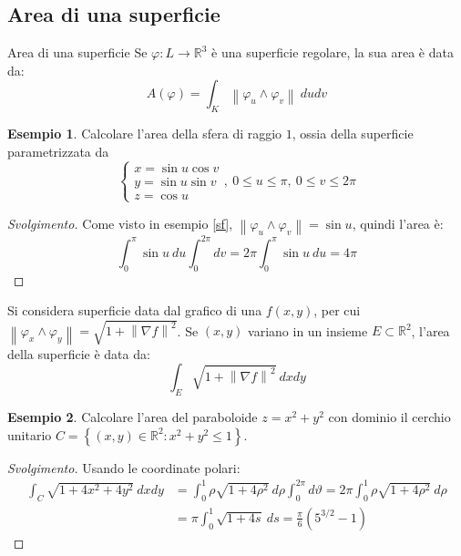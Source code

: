 \documentclass[10pt, a4paper]{scrartcl}
\newenvironment{svolgimento}{\renewcommand\qedsymbol{$\blacksquare$}\begin{proof}[Svolgimento]}{\end{proof}}
\theoremstyle{definition}
\newtheorem{esempio}{Esempio}
\numberwithin{esempio}{section}
\theoremstyle{definition}
\numberwithin{obs}{section}
\numberwithin{nota}{section}
\numberwithin{equation}{subsection}
\begin{document}
\subsection{Area di una superficie}
\begin{definizione}
	{Area di una superficie}{}
	Se $\varphi : L \to \mathbb{R}^3$ \`e una superficie regolare, la sua area \`e data da:
	\[
	A(\varphi ) = \int_{K}  \left\lVert \varphi _u \wedge \varphi _v \right\rVert \ du dv
	\] 
	
\end{definizione}
\begin{esempio}
Calcolare l'area della sfera di raggio $1$, ossia della superficie parametrizzata da
\[
\begin{cases}
	x = \sin u  \cos v\\
	y = \sin u \sin v \\
	z = \cos u
\end{cases}, \ 0\le u\le \pi,\ 0\le  v \le 2\pi
\] 
\begin{svolgimento}
	Come visto in esempio \ref{sf}, $\left\lVert \varphi _u \wedge \varphi _v \right\rVert = \sin u$, quindi l'area \`e:
	\[
	\int_{0} ^\pi \sin u\ du \int_{0} ^{2\pi} dv = 2\pi \int_{0} ^\pi \sin u \ du = 4\pi
	\] 
\end{svolgimento}
\end{esempio}
	Si considera superficie data dal grafico di una $f(x,y)$, per cui $\left\lVert \varphi _x \wedge \varphi _y \right\rVert  = \sqrt{1+\left\lVert \nabla f \right\rVert ^2} $.
	Se $(x,y)$ variano in un insieme $E \subset \mathbb{R}^2$, l'area della superficie \`e data da:
	\begin{equation}
		\int_{E} \sqrt{1 + \left\lVert \nabla f \right\rVert ^2 } \ dxdy
	\end{equation}
\begin{esempio}
Calcolare l'area del paraboloide $z = x^2 + y^2$ con dominio il cerchio unitario $C = \left\{ (x,y) \in \mathbb{R}^2 : x^2 + y^2 \le 1 \right\} $.
\begin{svolgimento}
	Usando le coordinate polari:
	\[
	\begin{split}
		\int_{C} \sqrt{1+4x^2 + 4y^2}  \ dx dy & = \int_{0} ^1 \rho \sqrt{1+ 4 \rho ^2 }  \ d\rho \int_{0} ^{2\pi } d\vartheta = 2\pi \int_{0} ^1 \rho  \sqrt{1 + 4 \rho ^2 }  \ d\rho \\
						       &= \pi \int_{0} ^1 \sqrt{1 + 4s }  \ ds = \frac{\pi}{6} \left(5 ^{3 / 2} - 1\right) 
	\end{split}
	\] 
	
\end{svolgimento}
\end{esempio}	
\end{document}
